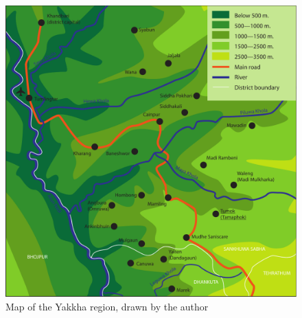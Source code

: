 \begin{figure}
\centering
\includegraphics[width=\textwidth]{figures/Yakkha_mapDS.pdf}
\caption{Map of the Yakkha region, drawn by the author}\label{map-sank}
\end{figure}



